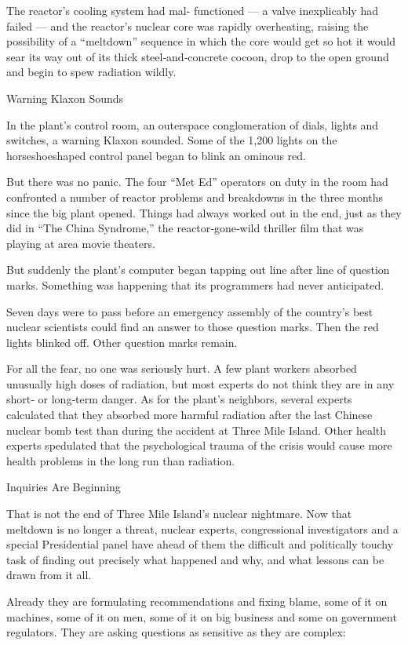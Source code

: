 The reactor's cooling system had mal- functioned --- a valve
inexplicably had failed --- and the reactor's nuclear core was rapidly
overheating, raising the possibility of a ``meltdown'' sequence in which
the core would get so hot it would sear its way out of its thick
steel‐and‐concrete cocoon, drop to the open ground and begin to spew
radiation wildly.

Warning Klaxon Sounds

In the plant's control room, an outerspace conglomeration of dials,
lights and switches, a warning Klaxon sounded. Some of the 1,200 lights
on the horseshoeshaped control panel began to blink an ominous red.

But there was no panic. The four ``Met Ed'' operators on duty in the
room had confronted a number of reactor problems and breakdowns in the
three months since the big plant opened. Things had always worked out in
the end, just as they did in ``The China Syndrome,'' the
reactor‐gone‐wild thriller film that was playing at area movie theaters.

But suddenly the plant's computer began tapping out line after line of
question marks. Something was happening that its programmers had never
anticipated.

Seven days were to pass before an emergency assembly of the country's
best nuclear scientists could find an answer to those question marks.
Then the red lights blinked off. Other question marks remain.

For all the fear, no one was seriously hurt. A few plant workers
absorbed unusually high doses of radiation, but most experts do not
think they are in any short‐ or long‐term danger. As for the plant's
neighbors, several experts calculated that they absorbed more harmful
radiation after the last Chinese nuclear bomb test than during the
accident at Three Mile Island. Other health experts spedulated that the
psychological trauma of the crisis would cause more health problems in
the long run than radiation.

Inquiries Are Beginning

That is not the end of Three Mile Island's nuclear nightmare. Now that
meltdown is no longer a threat, nuclear experts, congressional
investigators and a special Presidential panel have ahead of them the
difficult and politically touchy task of finding out precisely what
happened and why, and what lessons can be drawn from it all.

Already they are formulating recommendations and fixing blame, some of
it on machines, some of it on men, some of it on big business and some
on government regulators. They are asking questions as sensitive as they
are complex:

